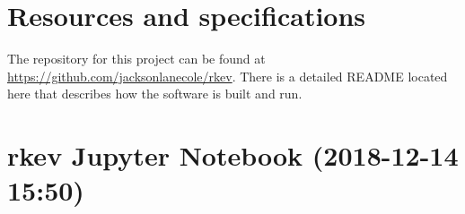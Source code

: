 \documentclass[onecolumn,titlepage,letterpaper,10pt]{article}
\newcommand{\functionof}[2]{#1\left(#2\right)}
\begin{document}

%

\clearpage


\begin{appendices}
    \section{Resources and specifications}
    The repository for this project can be found at
    \url{https://github.com/jacksonlanecole/rkev}. There is a detailed README
    located here that describes how the software is built and run.

    \section{rkev Jupyter Notebook (2018-12-14 15:50)}\label{app:jupyter}
    
\end{appendices}
\end{document}
